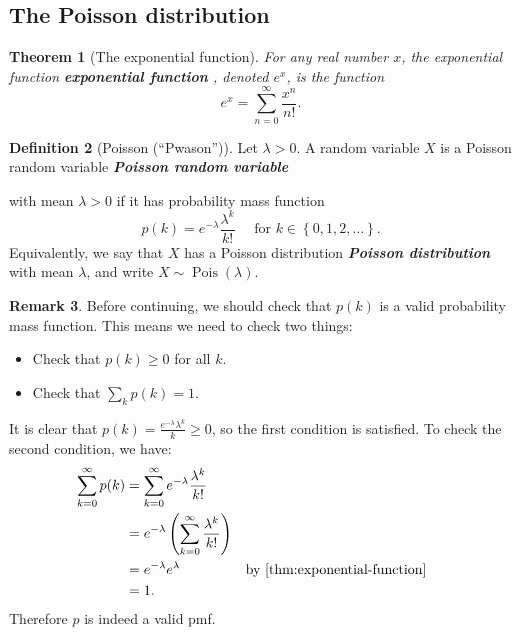 \documentclass[10pt]{article}
\newtheorem{theorem}{Theorem}
\theoremstyle{definition}
\newtheorem{definition}[theorem]{Definition}
\newtheorem{remark}[theorem]{Remark}
\newcommand{\1}[1]{\textbf{1}_{\left[#1\right]}} %
\DeclareRobustCommand{\demph}[1]{%
  \ifmmode
  {\color{Blue}#1}%
  \else
  {\color{Blue}\bfseries\slshape #1}%
  \fi
}
\begin{document}
\subsection{The Poisson distribution}


\begin{theorem}[The exponential function]
  \label{thm:exponential-function}
  For any real number $x$, the \demph{exponential function}, denoted $e^{x}$,
  is the function
  \begin{equation*}
    e^{x} = \sum_{n=0}^{\infty}\frac{x^{n} }{n!}.
  \end{equation*}
\end{theorem}


\begin{definition}[Poisson (``Pwason'')]
  Let $\lambda>0$. A random variable $X$ is a \demph{Poisson random variable}
  with mean $\lambda>0$ if it has probability mass function
  \begin{equation*}
    p(k) = e^{-\lambda} \frac{\lambda^{k}}{k!} \quad \text{ for }k\in \left\{0,1,2,\ldots\right\}.
  \end{equation*}
  Equivalently, we say that $X$ has a \demph{Poisson distribution} with mean
  $\lambda$, and write $X\sim \operatorname{Pois}(\lambda)$.
\end{definition}

\begin{remark}
  Before continuing, we should check that $p(k)$ is a valid probability mass
  function. This means we need to check two things:
  \begin{itemize}
    \item Check that $p(k) \geq 0$ for all $k$.
    \item Check that $\sum_{k}p(k)=1$.
  \end{itemize}
  It is clear that $p(k) = \frac{e^{-\lambda}\lambda^{k}}{k}\geq 0$, so the
  first condition is satisfied. To check the second condition, we have:
  \begin{align*}
    \sum_{k=0}^{\infty}  p(k) 
    &= \sum_{k=0}^{\infty}e^{-\lambda}\frac{\lambda^{k}}{k!} \\
    &=e^{-\lambda}\left(\sum_{k=0}^{\infty}\frac{\lambda^{k}}{k!}\right) \\
    &= e^{-\lambda} e^{\lambda} &&\text{by \cref{thm:exponential-function} }\\
    &=1.
  \end{align*}
  Therefore $p$ is indeed a valid pmf.
\end{remark}
\end{document}
